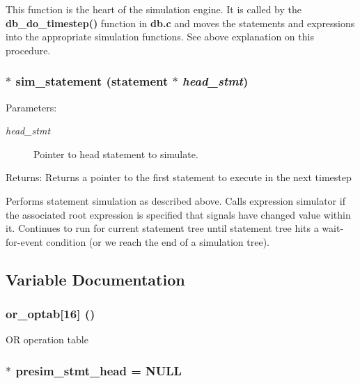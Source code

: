 This function is the heart of the simulation engine. It is called by the {\bf db\_\-do\_\-timestep()} function in {\bf db.c} and moves the statements and expressions into the appropriate simulation functions. See above explanation on this procedure. 
\subsubsection{$\ast$ sim\_\-statement ({\bf statement} $\ast$ {\em head\_\-stmt})}\label{sim_8c_a9}


\begin{Desc}
\item[Parameters:]
\begin{description}
\item[{\em head\_\-stmt}]Pointer to head statement to simulate.\end{description}
\end{Desc}
\begin{Desc}
\item[Returns:]Returns a pointer to the first statement to execute in the next timestep\end{Desc}
Performs statement simulation as described above. Calls expression simulator if the associated root expression is specified that signals have changed value within it. Continues to run for current statement tree until statement tree hits a wait-for-event condition (or we reach the end of a simulation tree). 

\subsection{Variable Documentation}
\subsubsection{ or\_\-optab[16] ()}\label{sim_8c_a0}


OR operation table 
\subsubsection{$\ast$ presim\_\-stmt\_\-head = NULL}\label{sim_8c_a3}


